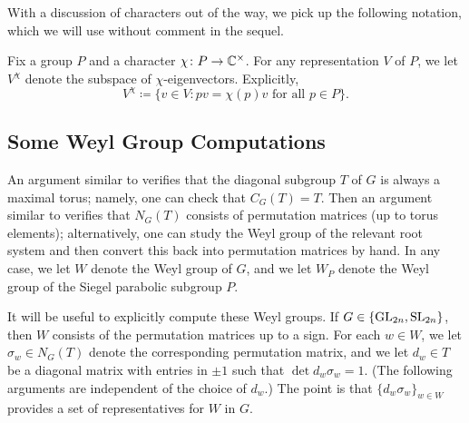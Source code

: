 With a discussion of characters out of the way, we pick up the following notation, which we will use without comment in the sequel.
\begin{notation}
    Fix a group $P$ and a character $\chi\colon P\to\mathbb C^\times$. For any representation $V$ of $P$, we let $V^\chi$ denote the subspace of $\chi$-eigenvectors. Explicitly,
    \[V^\chi\coloneqq\{v\in V:pv=\chi(p)v\text{ for all }p\in P\}.\]
\end{notation}

\subsection{Some Weyl Group Computations}
An argument similar to \cite[Example~17.88]{milne-alg-group} verifies that the diagonal subgroup $T$ of $G$ is always a maximal torus; namely, one can check that $C_G(T)=T$. Then an argument similar to \cite[Example~17.42]{milne-alg-group} verifies that $N_G(T)$ consists of permutation matrices (up to torus elements); alternatively, one can study the Weyl group of the relevant root system and then convert this back into permutation matrices by hand. In any case, we let $W$ denote the Weyl group of $G$, and we let $W_P$ denote the Weyl group of the Siegel parabolic subgroup $P$.

It will be useful to explicitly compute these Weyl groups. If $G\in\{\mathrm{GL}_{2n},\mathrm{SL}_{2n}\}$, then $W$ consists of the permutation matrices up to a sign. For each $w\in W$, we let $\sigma_w\in N_G(T)$ denote the corresponding permutation matrix, and we let $d_w\in T$ be a diagonal matrix with entries in $\pm1$ such that $\det d_w\sigma_w=1$. (The following arguments are independent of the choice of $d_w$.) The point is that $\{d_w\sigma_w\}_{w\in W}$ provides a set of representatives for $W$ in $G$.


